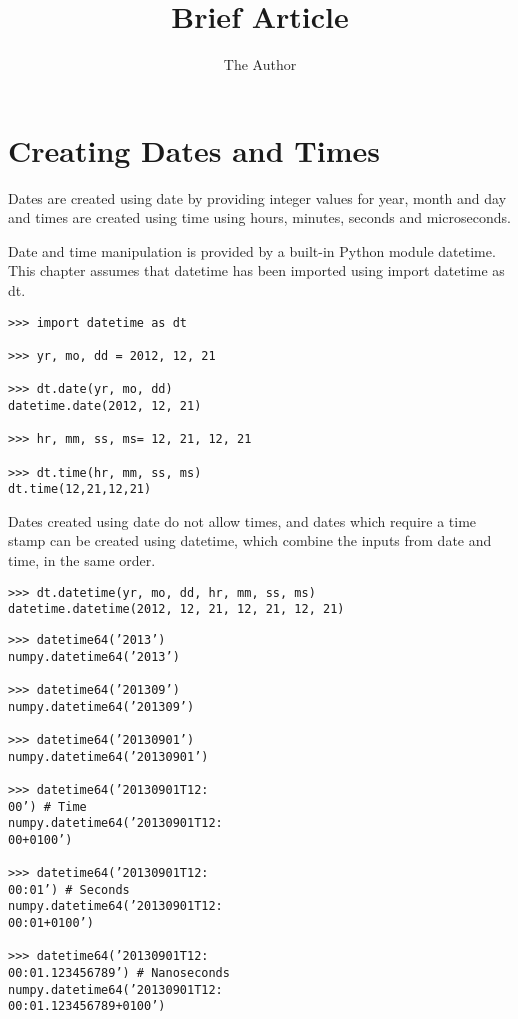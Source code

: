 \documentclass[11pt]{article} %
\title{Brief Article}
\author{The Author}
\begin{document}
\section{Creating Dates and Times}

Dates are created using date by providing integer values for year, month and day and times are created
using time using hours, minutes, seconds and microseconds.

Date and time manipulation is provided by a built-in Python module datetime. This chapter assumes that
datetime has been imported using import datetime as dt.

\begin{framed}
\begin{verbatim}
>>> import datetime as dt

>>> yr, mo, dd = 2012, 12, 21

>>> dt.date(yr, mo, dd)
datetime.date(2012, 12, 21)

>>> hr, mm, ss, ms= 12, 21, 12, 21

>>> dt.time(hr, mm, ss, ms)
dt.time(12,21,12,21)

\end{verbatim}
\end{framed}

Dates created using date do not allow times, and dates which require a time stamp can be created using
datetime, which combine the inputs from date and time, in the same order.
\begin{framed}
\begin{verbatim}
>>> dt.datetime(yr, mo, dd, hr, mm, ss, ms)
datetime.datetime(2012, 12, 21, 12, 21, 12, 21)

\end{verbatim}
\end{framed}


\begin{verbatim}
>>> datetime64(’2013’)
numpy.datetime64(’2013’)

>>> datetime64(’201309’)
numpy.datetime64(’201309’)

>>> datetime64(’20130901’)
numpy.datetime64(’20130901’)

>>> datetime64(’20130901T12:
00’) # Time
numpy.datetime64(’20130901T12:
00+0100’)

>>> datetime64(’20130901T12:
00:01’) # Seconds
numpy.datetime64(’20130901T12:
00:01+0100’)

>>> datetime64(’20130901T12:
00:01.123456789’) # Nanoseconds
numpy.datetime64(’20130901T12:
00:01.123456789+0100’)
\end{verbatim}
\end{document}
